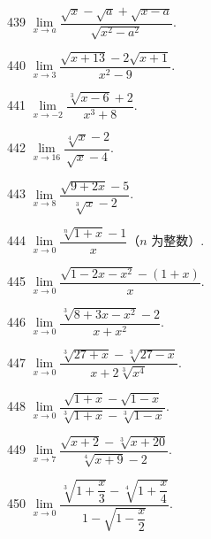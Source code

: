 \begin{prob}[S]{439}
$\lim\limits_{x \to a} \dfrac{\sqrt{x} - \sqrt{a} + \sqrt{x - a}}{\sqrt{x^2 - a^2}}$.
\end{prob}

\begin{prob}[S]{440}
$\lim\limits_{x \to 3} \dfrac{\sqrt{x + 13} - 2\sqrt{x + 1}}{x^2 - 9}$.
\end{prob}

\begin{prob}[S]{441}
$\lim\limits_{x \to -2} \dfrac{\sqrt[3]{x - 6} + 2}{x^3 + 8}$.
\end{prob}

\begin{prob}[S]{442}
$\lim\limits_{x \to 16} \dfrac{\sqrt[4]{x} - 2}{\sqrt{x} - 4}$.
\end{prob}

\begin{prob}[S]{443}
$\lim\limits_{x \to 8} \dfrac{\sqrt{9 + 2x} - 5}{\sqrt[3]{x} - 2}$.
\end{prob}

\begin{prob}[S]{444}
$\lim\limits_{x \to 0} \dfrac{\sqrt[n]{1 + x} - 1}{x}$（$n$ 为整数）.
\end{prob}

\begin{prob}[S]{445}
$\lim\limits_{x \to 0} \dfrac{\sqrt{1 - 2x - x^2} - (1 + x)}{x}$.
\end{prob}

\begin{prob}[S]{446}
$\lim\limits_{x \to 0} \dfrac{\sqrt[3]{8 + 3x - x^2} - 2}{x + x^2}$.
\end{prob}

\begin{prob}[S]{447}
$\lim\limits_{x \to 0} \dfrac{\sqrt[3]{27 + x} - \sqrt[3]{27 - x}}{x + 2\sqrt[3]{x^4}}$.
\end{prob}

\begin{prob}[S]{448}
$\lim\limits_{x \to 0} \dfrac{\sqrt{1 + x} - \sqrt{1 - x}}{\sqrt[3]{1 + x} - \sqrt[3]{1 - x}}$.
\end{prob}

\begin{prob}[S]{449}
$\lim\limits_{x \to 7} \dfrac{\sqrt{x + 2} - \sqrt[3]{x + 20}}{\sqrt[4]{x + 9} - 2}$.
\end{prob}

\begin{prob}[S]{450}
$\lim\limits_{x \to 0} \dfrac{\sqrt[3]{1 + \dfrac{x}{3}} - \sqrt[4]{1 + \dfrac{x}{4}}}{1 - \sqrt{1 - \dfrac{x}{2}}}$.
\end{prob}

